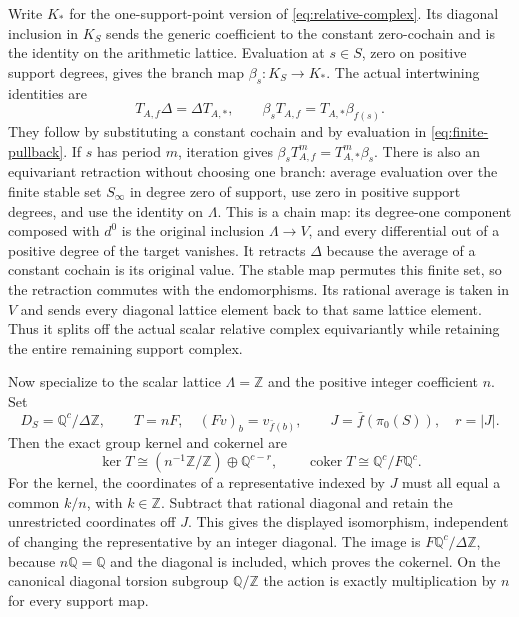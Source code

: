 \documentclass[11pt,a4paper]{article}
\theoremstyle{definition}\newtheorem{definition}[theorem]{Definition}
\newcommand{\Z}{\mathbb Z}\newcommand{\Q}{\mathbb Q}
\providecommand{\coker}{\operatorname{coker}}
\begin{document}
Write $K_*$ for the one-support-point version of
\eqref{eq:relative-complex}. Its diagonal inclusion in $K_S$ sends
the generic coefficient to the constant zero-cochain and is the
identity on the arithmetic lattice. Evaluation at $s\in S$, zero
on positive support degrees, gives the branch map $\beta_s:K_S\to K_*$.
The actual intertwining identities are
\[
 T_{A,f}\Delta=\Delta T_{A,*},\qquad
 \beta_sT_{A,f}=T_{A,*}\beta_{f(s)}.
 \tag{SE22}\label{eq:branch-action}
\]
They follow by substituting a constant cochain and by evaluation in
\eqref{eq:finite-pullback}. If $s$ has period $m$, iteration gives
$\beta_sT_{A,f}^m=T_{A,*}^m\beta_s$.
There is also an equivariant retraction without choosing one branch:
average evaluation over the finite stable set $S_\infty$ in degree
zero of support, use zero in positive support degrees, and use the
identity on $\Lambda$. This is a chain map: its degree-one component
composed with $d^0$ is the original inclusion $\Lambda\to V$, and
every differential out of a positive degree of the target vanishes.
It retracts $\Delta$ because the average of a constant cochain is its
original value. The stable map permutes this finite set,
so the retraction commutes with the endomorphisms. Its rational
average is taken in $V$ and sends every diagonal lattice element
back to that same lattice element. Thus it splits off the actual
scalar relative complex equivariantly while retaining the entire
remaining support complex.

Now specialize to the scalar lattice $\Lambda=\Z$ and the positive
integer coefficient $n$. Set
\[
 D_S=\Q^c/\Delta\Z,\qquad
 T=nF,\quad (Fv)_b=v_{\bar f(b)},\qquad
 J=\bar f(\pi_0(S)),\quad r=|J|.
 \tag{SE23}\label{eq:full-degree-group}
\]
Then the exact group kernel and cokernel are
\[
 \ker T\cong(n^{-1}\Z/\Z)\oplus\Q^{c-r},\qquad
 \coker T\cong\Q^c/F\Q^c.
 \tag{SE24}\label{eq:noninvertible-degree}
\]
For the kernel, the coordinates of a representative indexed by $J$
must all equal a common $k/n$, with $k\in\Z$. Subtract that rational
diagonal and retain the unrestricted coordinates off $J$. This gives
the displayed isomorphism, independent of changing the representative
by an integer diagonal. The image is $F\Q^c/\Delta\Z$, because
$n\Q=\Q$ and the diagonal is included, which proves the cokernel.
On the canonical diagonal torsion subgroup $\Q/\Z$ the action is
exactly multiplication by $n$ for every support map.
\end{document}
